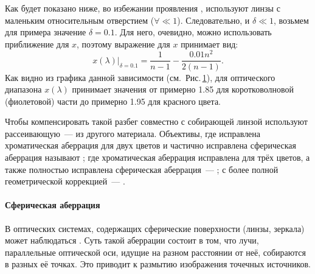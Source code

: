 \begin{figure}
    \centering
    \vspace{-1pc}
    \caption{}
    \label{pic:crown-dispersion-x}
\end{figure}
Как будет показано ниже, во избежании проявления , используют линзы с маленьким относительным отверстием ($\forall \ll 1$). Следовательно, и $\delta \ll 1$, возьмем для примера значение $\delta = 0.1$. Для него, очевидно, можно использовать приближение для $x$, поэтому выражение для $x$ принимает вид:
\begin{equation*}
    x(\lambda)|_{\delta = 0.1} = \frac{1}{n-1} - \frac{0.01 n^2}{2(n-1)}.
\end{equation*}
Как видно из графика данной зависимости (см.~Рис.\,\ref{pic:crown-dispersion-x}), для оптического диапазона $x(\lambda)$ принимает значения от примерно 1.85 для коротковолновой (фиолетовой) части до примерно 1.95 для красного цвета.

Чтобы компенсировать такой разбег совместно с собирающей линзой используют рассеивающую~--- из другого материала. Объективы, где исправлена хроматическая аберрация для двух цветов и частично исправлена сферическая аберрация называют ; где хроматическая аберрация исправлена для трёх цветов, а также полностью исправлена сферическая аберрация~--- ; с более полной геометрической коррекцией~--- .

\paragraph{Сферическая аберрация}
В оптических системах, содержащих сферические поверхности (линзы, зеркала) может наблюдаться . Суть такой аберрации состоит в том, что лучи, параллельные оптической оси, идущие на разном расстоянии от неё, собираются в разных её точках. Это приводит к размытию изображения точечных источников.

